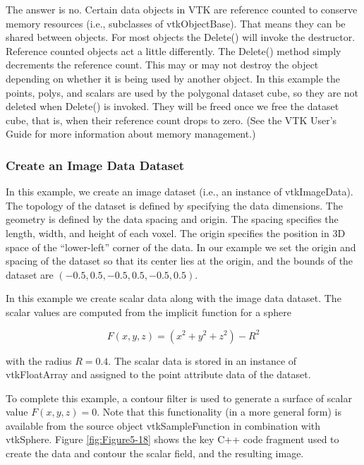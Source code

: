 The answer is no. Certain data objects in VTK are reference counted to conserve memory resources (i.e., subclasses of vtkObjectBase). That means they can be shared between objects. For most objects the Delete() will invoke the destructor. Reference counted objects act a little differently. The Delete() method simply decrements the reference count. This may or may not destroy the object depending on whether it is being used by another object. In this example the points, polys, and scalars are used by the polygonal dataset cube, so they are not deleted when Delete() is invoked. They will be freed once we free the dataset cube, that is, when their reference count drops to zero. (See the VTK User’s Guide for more information about memory management.)

\subsubsection{Create an Image Data Dataset}

In this example, we create an image dataset (i.e., an instance of vtkImageData). The topology of the dataset is defined by specifying the data dimensions. The geometry is defined by the data spacing and origin. The spacing specifies the length, width, and height of each voxel. The origin specifies the position in 3D space of the “lower-left” corner of the data. In our example we set the origin and spacing of the dataset so that its center lies at the origin, and the bounds of the dataset are $(-0.5,0.5, -0.5,0.5, -0.5,0.5)$.

In this example we create scalar data along with the image data dataset. The scalar values are computed from the implicit function for a sphere

\begin{equation}\label{eq:5.2}
F(x,y,z) = (x^2 + y^2 + z^2)-R^2\end{equation}

with the radius $R = 0.4$. The scalar data is stored in an instance of vtkFloatArray and assigned to the point attribute data of the dataset.

To complete this example, a contour filter is used to generate a surface of scalar value $F(x, y, z) = 0$. Note that this functionality (in a more general form) is available from the source object vtkSampleFunction in combination with vtkSphere. Figure \ref{fig:Figure5-18} shows the key C++ code fragment used to create the data and contour the scalar field, and the resulting image.

